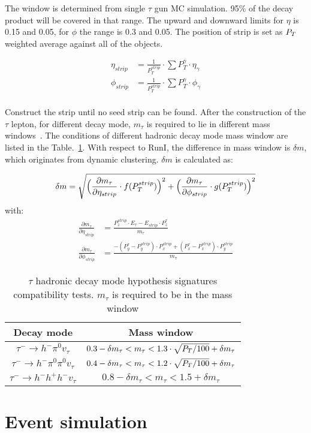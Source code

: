 The window is determined from single $\tau$ gun MC simulation. 95\% of the decay product will be covered in that range. The upward and downward limits for $\eta$ is 0.15 and 0.05, for $\phi$ the range is 0.3 and 0.05.  The position of strip is set as $P_{T}$ weighted average against all of the objects. 

\begin{align*}
\eta_{strip}&=\frac{1}{P_{T}^{strip}}\cdot\sum P_{T}^{\gamma}\cdot\eta_{\gamma}\\
\phi_{strip}&=\frac{1}{P_{T}^{strip}}\cdot\sum P_{T}^{\gamma}\cdot\phi_{\gamma}\\
\end{align*}

Construct the strip until no seed strip can be found. After the construction of the $\tau$ lepton, for different decay mode, $m_{\tau}$ is required to lie in different mass windows~\cite{TauReconstuction}.  The conditions of different hadronic decay mode mass window are listed in the Table.~\ref{tb:tauHdecayRecomass}. With respect to RunI, the difference in mass window is $\delta m$, which originates from dynamic clustering. $\delta m$ is calculated as:

\begin{align*}
\delta m&=\sqrt{\Big(\frac{\partial m_{\tau}}{\partial \eta_{strip}}\cdot f(P_{T}^{strip})\Big)^{2}+\Big(\frac{\partial m_{\tau}}{\partial \phi_{strip}}\cdot g(P_{T}^{strip})\Big)^{2}}\\
\end{align*}
with:
\begin{align*}
\frac{\partial m_{\tau}}{\partial\eta_{strip}}&=\frac{P_{z}^{strip}\cdot E_{\tau}-E_{strip}\cdot P_{z}^{\tau}}{m_{\tau}}\\
\frac{\partial m_{\tau}}{\partial\phi_{strip}}&=\frac{-(P_{y}^{\tau}-P_{y}^{strip})\cdot P_{x}^{strip}+(P_{x}^{\tau}-P_{x}^{strip})\cdot P_{y}^{strip}}{m_{\tau}}
\end{align*}


\begin{table}[htp]
\caption{$\tau$ hadronic decay mode hypothesis signatures compatibility tests. $m_{\tau}$ is required to be in the mass window }\label{tb:tauHdecayRecomass}
\begin{center}
\begin{tabular}{|c|c|}
\hline
Decay mode                                             & Mass window\\\hline
$\tau^{-}\to h^{-}\pi^{0} v_{\tau}$                       & $0.3-\delta m_{\tau}<m_{\tau}<1.3\cdot \sqrt{P_{T}/100}+\delta m_{\tau}$      \\\hline
$\tau^{-}\to h^{-}\pi^{0} \pi^{0}  v_{\tau}$       &  $0.4-\delta m_{\tau}<m_{\tau}<1.2\cdot \sqrt{P_{T}/100}+\delta m_{\tau}$   \\\hline
$\tau^{-}\to h^{-}h^{+}h^{-}v_{\tau}$                     & $0.8-\delta m_{\tau}<m_{\tau}<1.5+\delta m_{\tau}$   \\\hline
 \end{tabular}
\end{center}
\end{table}


\section{Event simulation}

